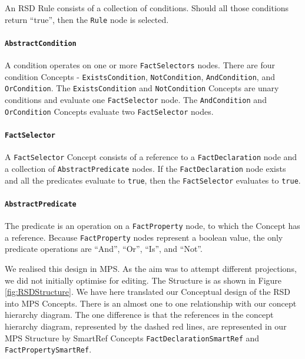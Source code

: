 An RSD Rule consists of a collection of conditions.
Should all those conditions return ``true'', then the \texttt{Rule} node is selected.

\paragraph{\texttt{AbstractCondition}} A condition operates on one or more \texttt{FactSelectors} nodes.
There are four condition Concepts - \linebreak\texttt{ExistsCondition}, \texttt{NotCondition}, \texttt{AndCondition}, and \texttt{OrCondition}.
The \texttt{ExistsCondition} and \texttt{NotCondition} Concepts are unary conditions and evaluate one \texttt{FactSelector} node.
The \texttt{AndCondition} and \texttt{OrCondition} Concepts evaluate two \texttt{FactSelector} nodes.

\paragraph{\texttt{FactSelector}} A \texttt{FactSelector} Concept consists of a reference to a \texttt{FactDeclaration} node and a collection of \texttt{AbstractPredicate} nodes.
If the \texttt{FactDeclaration} node exists and all the predicates evaluate to \texttt{true}, then the \texttt{FactSelector} evaluates to \texttt{true}.

\paragraph{\texttt{AbstractPredicate}} The predicate is an operation on a \texttt{FactProperty} node, to which the Concept has a reference.
Because \texttt{FactProperty} nodes represent a boolean value, the only predicate operations are ``And'', ``Or'', ``Is'', and ``Not''.

We realised this design in MPS.
As the aim was to attempt different projections, we did not initially optimise for editing.
The Structure is as shown in Figure \ref{fig:RSDStructure}.
We have here translated our Conceptual design of the RSD into MPS Concepts.
There is an almost one to one relationship with our concept hierarchy diagram.
The one difference is that the references in the concept hierarchy diagram, represented by the dashed red lines, are represented in our MPS Structure by SmartRef Concepts \texttt{FactDeclarationSmartRef} and \texttt{FactPropertySmartRef}.

